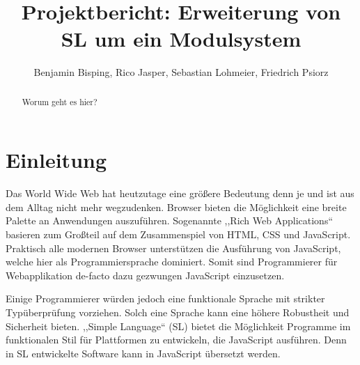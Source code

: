 \documentclass[runningheads]{llncs}
\author{Benjamin Bisping, Rico Jasper, Sebastian Lohmeier,
	Friedrich Psiorz}
\title{Projektbericht: \textbf{Erweiterung von SL um ein Modulsystem}}
\institute{Compilerbauprojekt SoSe 2013\\Technische Universität Berlin}
\begin{document}
\def\open{\texttt{(}}
\def\close{\texttt{)}}
\def\bropen{\texttt{\{}}
\def\brclose{\texttt{\}}}
\def\sqopen{\texttt{[}}
\def\sqclose{\texttt{]}}
\def\squote{\texttt{'}}
\def\dquote{\texttt{''}}
\def\eq{\texttt{=}}
\def\colon{\texttt{:}}
\def\lam{\mbox{\texttt{\BackslashTT}}}
\def\bar{\texttt{|}}
\def\comma{\texttt{,}}
\def\arrow{\texttt{->}}

\def\addint{\texttt{+}}
\def\subint{\texttt{-}}
\def\mulint{\texttt{*}}
\def\divint{\texttt{/}}

\def\ltint{\texttt{<}}
\def\leint{\texttt{<=}}
\def\eqint{\texttt{==}}
\def\neint{\texttt{/=}}
\def\geint{\texttt{>=}}
\def\gtint{\texttt{>}}

\def\exclamationOp{\texttt{!}}
\def\paragraphOp{\texttt{§}}
\def\percentOp{\texttt{\%}}
\def\ampOp{\texttt{\&}}
\def\questionOp{\texttt{?}}
\def\sharpOp{\texttt{\#}}
\def\pipeOp{\texttt{|}}

\maketitle

\begin{abstract}
Worum geht es hier?
\end{abstract}

\begingroup
\let\clearpage\relax
\tableofcontents
\endgroup

\section{Einleitung}

Das World Wide Web hat heutzutage eine größere Bedeutung denn je und ist aus dem Alltag nicht mehr wegzudenken. Browser bieten die Möglichkeit eine breite Palette an Anwendungen auszuführen. Sogenannte ,,Rich Web Applications`` basieren zum Großteil auf dem Zusammenspiel von HTML, CSS und JavaScript. Praktisch alle modernen Browser unterstützen die Ausführung von JavaScript, welche hier als Programmiersprache dominiert. Somit sind Programmierer für Webapplikation de-facto dazu gezwungen JavaScript einzusetzen.

Einige Programmierer würden jedoch eine funktionale Sprache mit strikter Typüberprüfung vorziehen. Solch eine Sprache kann eine höhere Robustheit und Sicherheit bieten. ,,Simple Language`` (SL) bietet die Möglichkeit Programme im funktionalen Stil für Plattformen zu entwickeln, die JavaScript ausführen. Denn in SL entwickelte Software kann in JavaScript übersetzt werden.
\end{document}
